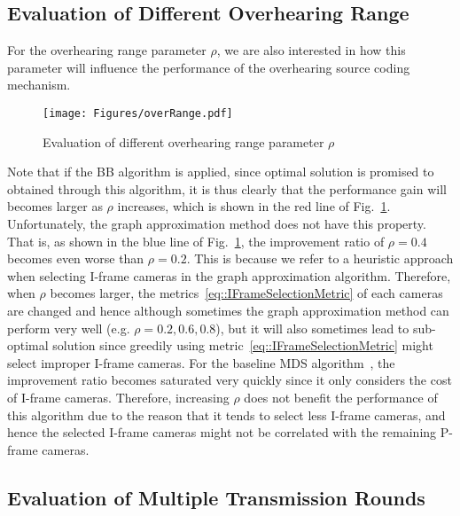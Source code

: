 \subsection{Evaluation of Different Overhearing Range}
For the overhearing range parameter $\rho$, we are also interested in how this parameter will influence the performance of the overhearing source coding mechanism.
%
\begin{figure}
\begin{center}
\texttt{[image: Figures/overRange.pdf]}
\caption{\label{fig::evaOverRange}Evaluation of different overhearing range parameter $\rho$}
\end{center}
\end{figure}
%
Note that if the BB algorithm is applied, since optimal solution is promised to obtained through this algorithm, it is thus clearly that the performance gain will becomes larger as $\rho$ increases, which is shown in the red line of Fig.~\ref{fig::evaOverRange}.
Unfortunately, the graph approximation method does not have this property.
That is, as shown in the blue line of Fig.~\ref{fig::evaOverRange}, the improvement ratio of $\rho = 0.4$ becomes even worse than $\rho = 0.2$.
This is because we refer to a heuristic approach when selecting I-frame cameras in the graph approximation algorithm.
Therefore, when $\rho$ becomes larger, the metrics~\eqref{eq::IFrameSelectionMetric} of each cameras are changed and hence although sometimes the graph approximation method can perform very well (e.g. $\rho = 0.2,0.6,0.8$), but it will also sometimes lead to sub-optimal solution since greedily using metric~\eqref{eq::IFrameSelectionMetric} might select improper I-frame cameras.
For the baseline MDS algorithm~\cite{MWDS_baseline}, the improvement ratio becomes saturated very quickly since it only considers the cost of I-frame cameras.
Therefore, increasing $\rho$ does not benefit the performance of this algorithm due to the reason that it tends to select less I-frame cameras, and hence the selected I-frame cameras might not be correlated with the remaining P-frame cameras.

\subsection{Evaluation of Multiple Transmission Rounds}
%

